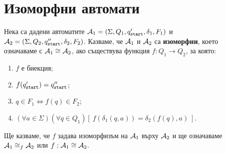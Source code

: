 \section{Изоморфни автомати}
\label{sect:isomorphic}

Нека са дадени автоматите
$\mathcal{A}_1 = (\Sigma,Q_1,q_{\texttt{start}}',\delta_1,F_1)$ и $\mathcal{A}_2 = (\Sigma, Q_2, q_{\texttt{start}}'', \delta_2, F_2)$.
Казваме, че $\mathcal{A}_1$ и $\mathcal{A}_2$ са {\bf изоморфни}, което означаваме с $\mathcal{A}_1 \cong \mathcal{A}_2$, ако
съществува функция $f: Q_1\to Q_2$, за която:
\begin{enumerate}[(1)]
\item
  $f$ е биекция;
\item
  $f(q_{\texttt{start}}') = q_{\texttt{start}}''$;
\item
  $q \in F_1 \iff f(q) \in F_2$;
\item
  $(\forall a\in\Sigma)(\forall q\in Q_1)[\ f(\delta_1(q,a)) = \delta_2(f(q),a)\ ]$.
\end{enumerate}
Ще казваме, че $f$ задава изоморфизъм на $\mathcal{A}_1$ върху $\mathcal{A}_2$ и ще означаваме $\mathcal{A}_1 \cong_f \mathcal{A}_2$ или $f:\mathcal{A}_1 \cong \mathcal{A}_2$.

